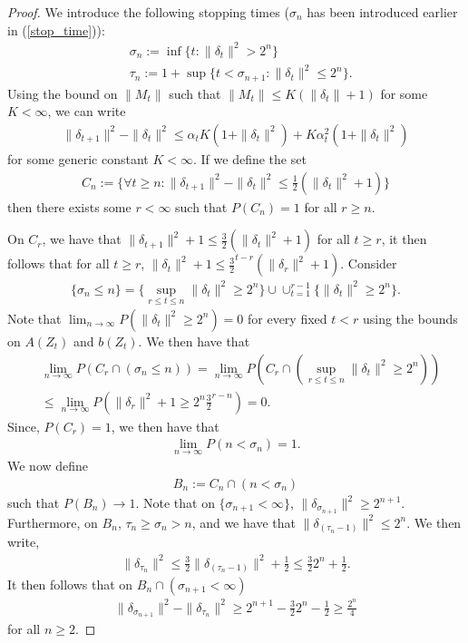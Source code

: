\documentclass[11pt]{article}
\begin{document}
\begin{proof}
We introduce the following stopping times ($\sigma_n$ has been introduced earlier in (\ref{stop_time})):
\begin{align*}
&\sigma_n:=\inf \{t: \|\delta_t\|^2 > 2^n\}\\
& \tau_n:=1+\sup\{t<\sigma_{n+1}: \|\delta_t\|^2\leq 2^n\}.
\end{align*}
Using the bound on $\|M_t\|$ such that $\|M_t\| \leq K(\|\delta_t\|+1)$ for some $K<\infty$, we can write 
\begin{align*}
\|\delta_{t+1}\|^2-\|\delta_t\|^2\leq \alpha_t K (1+\|\delta_t\|^2) + K \alpha_t^2(1+\|\delta_t\|^2)
\end{align*}
for some generic constant $K<\infty$. If we define the set 
\begin{align*}
C_n:=\{ \forall t\geq n: \|\delta_{t+1}\|^2-\|\delta_t\|^2 \leq \frac{1}{2}(\|\delta_t\|^2+1) \}
\end{align*}
then there exists some $r<\infty$ such that $P(C_n)=1$ for all $r\geq n$.

On $C_r$, we have that 
$
\|\delta_{t+1}\|^2 + 1 \leq \frac{3}{2}(\|\delta_t\|^2+1)
$ for all $t\geq r$, it then follows that for all $t\geq r$, $\|\delta_{t}\|^2 + 1 \leq \frac{3}{2}^{t-r}(\|\delta_r\|^2+1)$. Consider 
\begin{align*}
\{\sigma_n\leq n\} = \{\sup_{r\leq t\leq n} \|\delta_t\|^2 \geq 2^n\} \cup \cup_{t=1}^{r-1} \{\|\delta_t\|^2\geq 2^n\}.
\end{align*}
Note that $\lim_{n\to\infty}P(\|\delta_t\|^2\geq 2^n)=0$ for every fixed $t<r$ using the bounds on $A(Z_t)$ and $b(Z_t)$. We then have that
\begin{align*}
&\lim_{n\to\infty}P(C_r \cap (\sigma_n\leq n)) = \lim_{n\to\infty}P(C_r\cap (\sup_{r\leq t\leq n} \|\delta_t\|^2\geq 2^n))\\
&\leq \lim_{n\to\infty} P(\|\delta_r\|^2 + 1 \geq 2^n \frac{3}{2}^{r-n}) = 0.
\end{align*}
Since, $P(C_r)= 1$, we then have that 
\begin{align*}
\lim_{n\to\infty}P(n<\sigma_n)=1.
\end{align*}
We now define
\begin{align}\label{B_n_set}
B_n:=C_n\cap (n<\sigma_n)
\end{align}
such that $P(B_n)\to 1$. Note that on $\{\sigma_{n+1}<\infty\}$, $\|\delta_{\sigma_{n+1}}\|^2 \geq 2^{n+1}$. Furthermore, on $B_n$, $\tau_{n}\geq \sigma_n>n$, and we have that $\|\delta_{(\tau_n-1)}\|^2\leq 2^n$. We then write,
\begin{align*}
\|\delta_{\tau_n}\|^2\leq \frac{3}{2}\|\delta_{(\tau_n-1)}\|^2 + \frac{1}{2}\leq \frac{3}{2}2^n + \frac{1}{2}.
\end{align*}
It then follows that on $B_n\cap (\sigma_{n+1}<\infty)$
\begin{align}\label{key_step1}
\|\delta_{\sigma_{n+1}}\|^2 - \|\delta_{\tau_n}\|^2\geq 2^{n+1} - \frac{3}{2}2^n - \frac{1}{2}\geq \frac{2^n}{4}
\end{align}
for all $n\geq 2$.


\end{proof}
\end{document}
